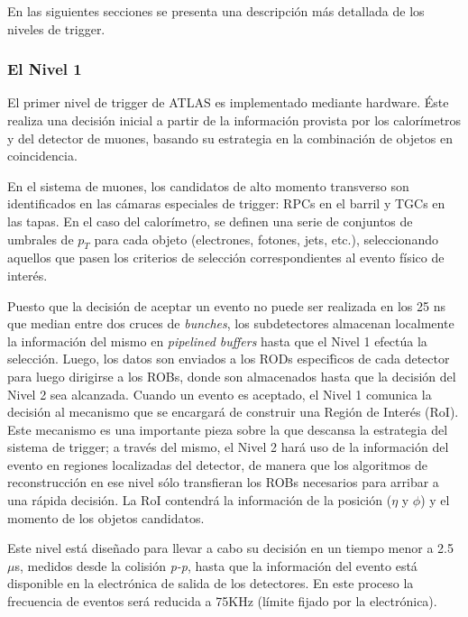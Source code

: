   En las siguientes secciones se presenta una descripci\'on m\'as detallada de los niveles de trigger.

 
\subsubsection{El Nivel 1}

   El primer nivel de trigger de ATLAS es implementado mediante hardware. \'Este realiza una decisi\'on inicial a partir de la informaci\'on provista por los calor\'imetros y del detector de muones, basando su estrategia en la combinaci\'on de objetos en coincidencia. %
  
   En el sistema de muones, los candidatos de alto momento transverso son identificados en las c\'amaras especiales de trigger: RPCs en el barril y TGCs en las tapas. En el caso del calor\'imetro, se definen una serie de conjuntos de umbrales de $p_T$ para cada objeto (electrones, fotones, jets, etc.), seleccionando aquellos que pasen los criterios de selecci\'on correspondientes al evento f\'isico de inter\'es. 

   Puesto que la decisi\'on de aceptar un evento no puede ser realizada en los 25 ns que median entre dos cruces de \emph{bunches}, los subdetectores almacenan localmente la informaci\'on del mismo en \emph{pipelined buffers} hasta que el Nivel 1 efect\'ua la selecci\'on. Luego, los datos son enviados a los RODs especi\'ficos de cada detector para luego dirigirse a los ROBs, donde son almacenados hasta que la decisi\'on del Nivel 2 sea alcanzada. 
   Cuando un evento es aceptado, el Nivel 1 comunica la decisi\'on al mecanismo que se encargar\'a de construir una Regi\'on de Inter\'es (RoI). Este mecanismo es una importante pieza sobre la que descansa la estrategia del sistema de trigger; a trav\'es del mismo, el Nivel 2 har\'a uso de la informaci\'on del evento en regiones localizadas del detector, de manera que los algoritmos de reconstrucci\'on en ese nivel s\'olo transfieran los ROBs necesarios para arribar a una r\'apida decisi\'on. %
La RoI contendr\'a la informaci\'on de la posici\'on ($\eta$ y $\phi$) y el momento de los objetos candidatos.

   Este nivel est\'a dise\~nado para llevar a cabo su decisi\'on en un tiempo menor a 2.5 $\mu$s, medidos desde la colisi\'on \emph{p-p}, hasta que la informaci\'on del evento est\'a disponible en la electr\'onica de salida de los detectores. En este proceso la frecuencia de eventos ser\'a reducida a 75KHz (l\'imite fijado por la electr\'onica).


